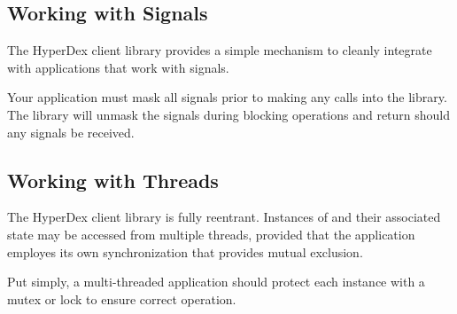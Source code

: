 

\subsection{Working with Signals}
\label{sec:api:c:client:signals}

The HyperDex client library provides a simple mechanism to cleanly integrate
with applications that work with signals.

Your application must mask all signals prior to making any calls into the
library.  The library will unmask the signals during blocking operations and
return  should any signals be received.

\subsection{Working with Threads}
\label{sec:api:c:client:threads}

The HyperDex client library is fully reentrant.  Instances of  and their associated state may be accessed from multiple
threads, provided that the application employes its own synchronization that
provides mutual exclusion.

Put simply, a multi-threaded application should protect each  instance with a mutex or lock to ensure correct operation.
